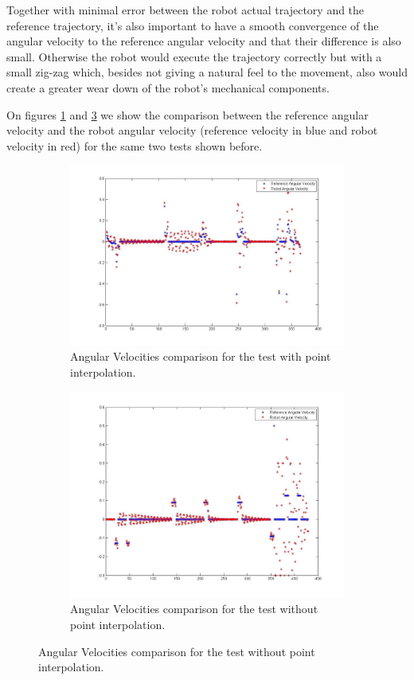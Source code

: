 \documentclass[11pt,a4paper]{scrartcl}
\begin{document}
Together with minimal error between the robot actual trajectory and the reference trajectory, it's also important to have a smooth convergence of the angular velocity to the reference angular velocity and that their difference is also small. Otherwise the robot would execute the trajectory correctly but with a small zig-zag which, besides not giving a natural feel to the movement, also would create a greater wear down of the robot's mechanical components.

On figures \ref{fig:simulation_velocities} and \ref{fig:simulation_velocities_fixed} we show the comparison between the reference angular velocity and the robot angular velocity (reference velocity in blue and robot velocity in red) for the same two tests shown before.

	\begin{figure}[H]
      \centering
      \begin{subfigure}{.5\textwidth}
          \centering
          \includegraphics[width=0.7\linewidth]{simulation_velocities.jpg}
          \caption{Angular Velocities comparison for the test with point interpolation.}
          \label{fig:simulation_velocities}
      \end{subfigure}%
      \begin{subfigure}{.5\textwidth}
          \centering
          \includegraphics[width=0.7\linewidth]{simulation_velocities_fixed.jpg}
          \caption{Angular Velocities comparison for the test without point interpolation.}
          \label{fig:simulation_velocities_fixed}
      \end{subfigure}
	\end{figure}
\end{document}
